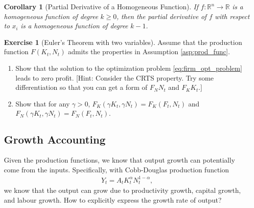 \documentclass{book}
\newtheorem{corollary}[theorem]{Corollary}
\theoremstyle{definition}
\newtheorem{exercise}{Exercise}[chapter]
\theoremstyle{plain}
\begin{document}
\begin{corollary}[Partial Derivative of a Homogeneous Function]\label{cor:par_deri_homo_func}
    If $f: \mathbb{R}^n \to \mathbb{R}$ is a homogeneous function of degree $k\geq 0$, then the partial derivative of $f$ with respect to $x_i$ is a homogeneous function of degree $k-1$.
\end{corollary}

\begin{exercise}[Euler's Theorem with two variables] \label{ex:euler_theorem}
    Assume that the production function $F(K_t, N_t)$ admits the properties in Assumption \ref{asp:prod_func}. 
    \begin{enumerate}[label=(\arabic*)]
        \item Show that the solution to the optimization problem \eqref{eq:firm_opt_problem} leads to zero profit. [Hint: Consider the CRTS property. Try some differentiation so that you can get a form of $F_N N_t$ and $F_K K_t$.]
        \item Show that for any $\gamma > 0$, $F_K(\gamma K_t, \gamma N_t) = F_K(F_t, N_t)$ and $F_N(\gamma K_t, \gamma N_t) = F_N(F_t, N_t)$.
    \end{enumerate}
\end{exercise}

\subsection{Growth Accounting}
Given the production functions, we know that output growth can potentially come from the inputs. Specifically, with Cobb-Douglas production function
\begin{align*}
    Y_t = A_t K_t^{\alpha} N_t^{1-\alpha},
\end{align*}
we know that the output can grow due to productivity growth, capital growth, and labour growth. How to explicitly express the growth rate of output? 
\end{document}

